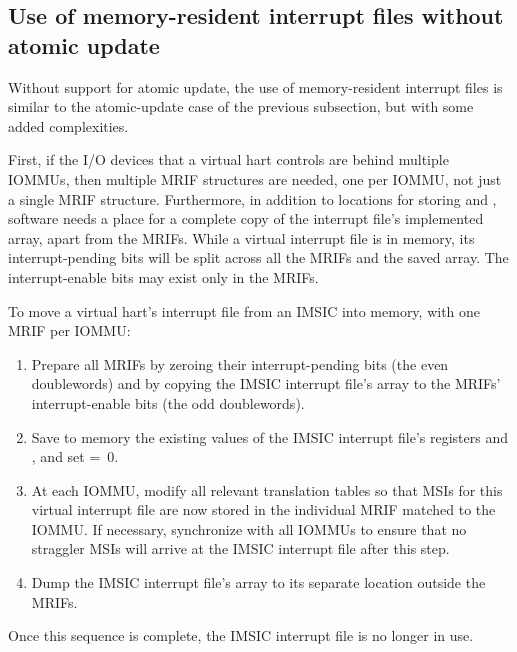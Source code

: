 \subsection{Use of memory-resident interrupt files without atomic update}

Without support for atomic update, the use of memory-resident interrupt
files is similar to the atomic-update case of the previous subsection,
but with some added complexities.

First, if the I/O devices that a virtual hart controls are behind
multiple \mbox{IOMMUs}, then multiple MRIF structures are needed, one per
\mbox{IOMMU}, not just a single MRIF structure.
Furthermore, in addition to locations for storing  and
, software needs a place for a complete copy of the
interrupt file's implemented  array, apart from the MRIFs.
While a virtual interrupt file is in memory, its interrupt-pending bits
will be split across all the MRIFs and the saved  array.
The interrupt-enable bits may exist only in the MRIFs.

To move a virtual hart's interrupt file from an IMSIC into memory, with
one MRIF per \mbox{IOMMU}:
\begin{enumerate}

\item
Prepare all MRIFs by zeroing their interrupt-pending bits (the even
doublewords) and by copying the IMSIC interrupt file's  array to
the MRIFs' interrupt-enable bits (the odd doublewords).

\item
Save to memory the existing values of the IMSIC interrupt file's
registers  and , and set 
=~0.

\item
At each \mbox{IOMMU}, modify all relevant translation tables so that MSIs
for this virtual interrupt file are now stored in the individual MRIF
matched to the \mbox{IOMMU}.
If necessary, synchronize with all \mbox{IOMMU}s to ensure that no straggler
MSIs will arrive at the IMSIC interrupt file after this step.

\item
Dump the IMSIC interrupt file's  array to its separate location
outside the MRIFs.

\end{enumerate}
Once this sequence is complete, the IMSIC interrupt file is no longer
in use.

